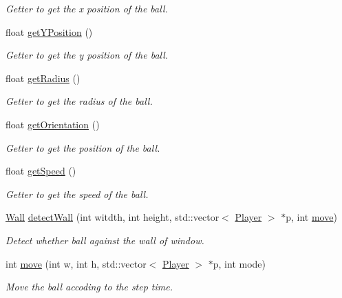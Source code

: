 \begin{DoxyCompactItemize}
\begin{DoxyCompactList}\small\item\em Getter to get the x position of the ball. \end{DoxyCompactList}\item 
\hypertarget{classBall_afc76d375509152ca9fcb69c93f57600e}{float \hyperlink{classBall_afc76d375509152ca9fcb69c93f57600e}{get\+Y\+Position} ()}\label{classBall_afc76d375509152ca9fcb69c93f57600e}

\begin{DoxyCompactList}\small\item\em Getter to get the y position of the ball. \end{DoxyCompactList}\item 
\hypertarget{classBall_a01a1890f5a86e8caeb4f91660a4f5700}{float \hyperlink{classBall_a01a1890f5a86e8caeb4f91660a4f5700}{get\+Radius} ()}\label{classBall_a01a1890f5a86e8caeb4f91660a4f5700}

\begin{DoxyCompactList}\small\item\em Getter to get the radius of the ball. \end{DoxyCompactList}\item 
\hypertarget{classBall_ae16e7b3e1954f1a1854bd3d5b0b59223}{float \hyperlink{classBall_ae16e7b3e1954f1a1854bd3d5b0b59223}{get\+Orientation} ()}\label{classBall_ae16e7b3e1954f1a1854bd3d5b0b59223}

\begin{DoxyCompactList}\small\item\em Getter to get the position of the ball. \end{DoxyCompactList}\item 
\hypertarget{classBall_abf977c799bfc86ea3e6e08a063c032eb}{float \hyperlink{classBall_abf977c799bfc86ea3e6e08a063c032eb}{get\+Speed} ()}\label{classBall_abf977c799bfc86ea3e6e08a063c032eb}

\begin{DoxyCompactList}\small\item\em Getter to get the speed of the ball. \end{DoxyCompactList}\item 
\hyperlink{Ball_8h_ad4f6886266572e51d198a61a6c762ce5}{Wall} \hyperlink{classBall_ae1f44298fed16c1b14c13a46dcd0b8a7}{detect\+Wall} (int witdth, int height, std\+::vector$<$ \hyperlink{classPlayer}{Player} $>$ $\ast$p, int \hyperlink{classBall_a046fc0a1d7a500457d3481c8c603777f}{move})
\begin{DoxyCompactList}\small\item\em Detect whether ball against the wall of window. \end{DoxyCompactList}\item 
int \hyperlink{classBall_a046fc0a1d7a500457d3481c8c603777f}{move} (int w, int h, std\+::vector$<$ \hyperlink{classPlayer}{Player} $>$ $\ast$p, int mode)
\begin{DoxyCompactList}\small\item\em Move the ball accoding to the step time. \end{DoxyCompactList}\end{DoxyCompactItemize}


